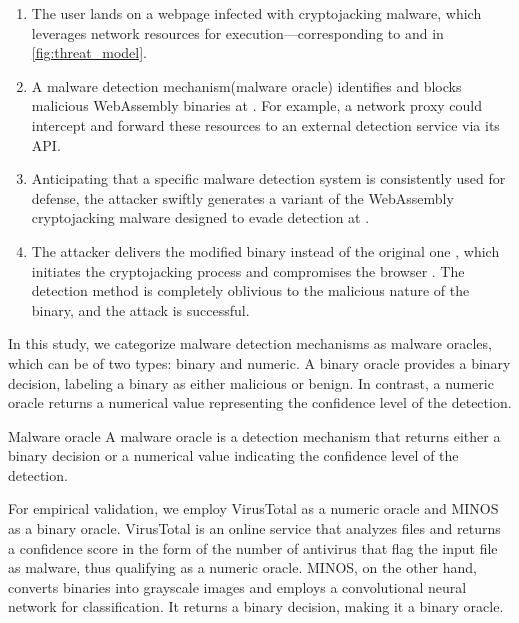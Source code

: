\begin{enumerate}
    
    \item The user lands on a webpage infected with cryptojacking malware, which leverages network resources for execution—corresponding to  and  in \autoref{fig:threat_model}. 
    
    \item A malware detection mechanism(malware oracle) identifies and blocks malicious WebAssembly binaries at . 
    For example, a network proxy could intercept and forward these resources to an external detection service via its API.
    
    \item Anticipating that a specific malware detection system is consistently used for defense, the attacker swiftly generates a variant of the WebAssembly cryptojacking malware designed to evade detection at .
    
    \item The attacker delivers the modified binary instead of the original one , which initiates the cryptojacking process and compromises the browser . The detection method is completely oblivious to the malicious nature of the binary, and the attack is successful.
    
\end{enumerate}



In this study, we categorize malware detection mechanisms as malware oracles, which can be of two types: binary and numeric. 
A binary oracle provides a binary decision, labeling a \Wasm binary as either malicious or benign. 
In contrast, a numeric oracle returns a numerical value representing the confidence level of the detection.

\begin{definition}{Malware oracle}
    \label{malware_oracle_def}
    A malware oracle is a detection mechanism that returns either a binary decision or a numerical value indicating the confidence level of the detection.
\end{definition}


For empirical validation, we employ VirusTotal as a numeric oracle and MINOS \cite{MINOS} as a binary oracle. 
VirusTotal is an online service that analyzes files and returns a confidence score in the form of the number of antivirus that flag the input file as malware, thus qualifying as a numeric oracle. 
MINOS, on the other hand, converts \Wasm binaries into grayscale images and employs a convolutional neural network for classification. 
It returns a binary decision, making it a binary oracle.


